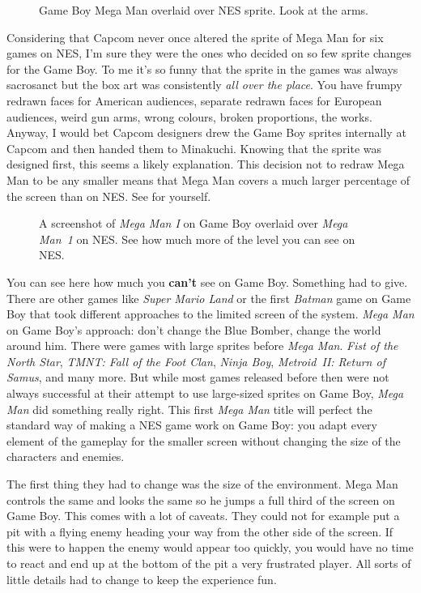 \documentclass{book}
\begin{document}
\FloatBarrier\vspace{\baselineskip}\begin{figure}[H]\caption*{Game Boy Mega Man overlaid over NES sprite. Look at the arms.}\end{figure}
Considering that Capcom never once altered the sprite of Mega Man for six games on NES, I’m sure they were the ones who decided on so few sprite changes for the Game Boy. To me it’s so funny that the sprite in the games was always sacrosanct but the box art was consistently \emph{all over the place}. You have frumpy redrawn faces for American audiences, separate redrawn faces for European audiences, weird gun arms, wrong colours, broken proportions, the works. Anyway, I would bet Capcom designers drew the Game Boy sprites internally at Capcom and then handed them to Minakuchi. Knowing that the sprite was designed first, this seems a likely explanation. This decision not to redraw Mega Man to be any smaller means that Mega Man covers a much larger percentage of the screen than on NES. See for yourself.\par
\FloatBarrier\vspace{\baselineskip}\begin{figure}[H]\caption*{A screenshot of \emph{Mega Man I} on Game Boy overlaid over \emph{Mega Man~1} on NES. See how much more of the level you can see on NES.}\end{figure}
You can see here how much you \textbf{can’t} see on Game Boy. Something had to give. There are other games like \emph{Super Mario Land} or the first \emph{Batman} game on Game Boy that took different approaches to the limited screen of the system. \emph{Mega Man} on Game Boy’s approach: don’t change the Blue Bomber, change the world around him. There were games with large sprites before \emph{Mega Man}. \emph{Fist of the North Star}, \emph{TMNT: Fall of the Foot Clan}, \emph{Ninja Boy}, \emph{Metroid~II: Return of Samus}, and many more. But while most games released before then were not always successful at their attempt to use large-sized sprites on Game Boy, \emph{Mega Man} did something really right. This first \emph{Mega Man} title will perfect the standard way of making a NES game work on Game Boy: you adapt every element of the gameplay for the smaller screen without changing the size of the characters and enemies.\par
The first thing they had to change was the size of the environment. Mega Man controls the same and looks the same so he jumps a full third of the screen on Game Boy. This comes with a lot of caveats. They could not for example put a pit with a flying enemy heading your way from the other side of the screen. If this were to happen the enemy would appear too quickly, you would have no time to react and end up at the bottom of the pit a very frustrated player. All sorts of little details had to change to keep the experience fun.\par
\end{document}
